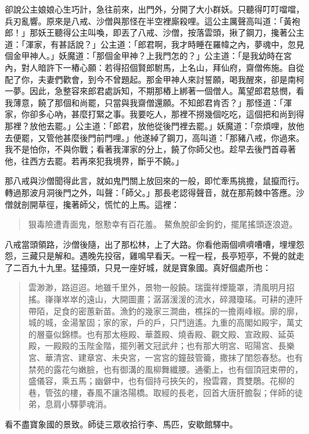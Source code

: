 卻說公主娘娘心生巧計，急往前來，出門外，分開了大小群妖。只聽得叮叮噹噹，兵刃亂響。原來是八戒、沙僧與那怪在半空裡廝殺哩。這公主厲聲高叫道：「黃袍郎！」那妖王聽得公主叫喚，即丟了八戒、沙僧，按落雲頭，揪了鋼刀，攙著公主道：「渾家，有甚話說？」公主道：「郎君啊，我才時睡在羅幃之內，夢魂中，忽見個金甲神人。」妖魔道：「那個金甲神？上我門怎的？」公主道：「是我幼時在宮內，對人暗許下一樁心願：若得招個賢郎駙馬，上名山，拜仙府，齋僧佈施。自從配了你，夫妻們歡會，到今不曾題起。那金甲神人來討誓願，喝我醒來，卻是南柯一夢。因此，急整容來郎君處訴知，不期那樁上綁著一個僧人。萬望郎君慈憫，看我薄意，饒了那個和尚罷，只當與我齋僧還願。不知郎君肯否？」那怪道：「渾家，你卻多心吶，甚麼打緊之事。我要吃人，那裡不撈幾個吃吃，這個把和尚到得那裡？放他去罷。」公主道：「郎君，放他從後門裡去罷。」妖魔道：「奈煩哩，放他去便罷，又管他甚麼後門前門哩。」他遂綽了鋼刀，高叫道：「那豬八戒，你過來。我不是怕你，不與你戰；看著我渾家的分上，饒了你師父也。趁早去後門首尋著他，往西方去罷。若再來犯我境界，斷乎不饒。」

那八戒與沙僧聞得此言，就如鬼門關上放回來的一般，即忙牽馬挑擔，鼠攛而行。轉過那波月洞後門之外，叫聲：「師父。」那長老認得聲音，就在那荊棘中答應。沙僧就剖開草徑，攙著師父，慌忙的上馬。這裡：
\begin{quote}
狠毒險遭青面鬼，慇懃幸有百花羞。
鰲魚脫卻金鉤釣，擺尾搖頭逐浪遊。
\end{quote}

八戒當頭領路，沙僧後隨，出了那松林，上了大路。你看他兩個嚌嚌嘈嘈，埋埋怨怨，三藏只是解和。遇晚先投宿，雞鳴早看天。一程一程，長亭短亭，不覺的就走了二百九十九里。猛擡頭，只見一座好城，就是寶象國。真好個處所也：
\begin{quote}
雲渺渺，路迢迢。地雖千里外，景物一般饒。瑞靄祥煙籠罩，清風明月招搖。嵂嵂崒崒的遠山，大開圖畫；潺潺湲湲的流水，碎濺瓊瑤。可耕的連阡帶陌，足食的密蕙新苗。漁釣的幾家三澗曲，樵採的一擔兩峰椒。廓的廓，城的城，金湯鞏固；家的家，戶的戶，只鬥逍遙。九重的高閣如殿宇，萬丈的層臺似錦標。也有那太極殿、華蓋殿、燒香殿、觀文殿、宣政殿、延英殿，一殿殿的玉陛金階，擺列著文冠武弁；也有那大明宮、昭陽宮、長樂宮、華清宮、建章宮、未央宮，一宮宮的鐘鼓管籥，撒抹了閨怨春愁。也有禁苑的露花勻嫩臉，也有御溝的風柳舞纖腰。通衢上，也有個頂冠束帶的，盛儀容，乘五馬；幽僻中，也有個持弓挾矢的，撥雲霧，貫雙鵰。花柳的巷，管弦的樓，春風不讓洛陽橋。取經的長老，回首大唐肝膽裂；伴師的徒弟，息肩小驛夢魂消。
\end{quote}

看不盡寶象國的景致。師徒三眾收拾行李、馬匹，安歇館驛中。

